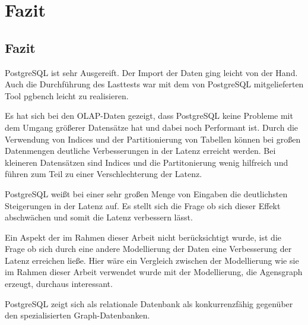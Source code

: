 \chapter{Fazit}
\section{Fazit}

PostgreSQL ist sehr Ausgereift. Der Import der Daten ging leicht von der Hand. Auch die Durchführung des Lasttests war mit dem von PostgreSQL mitgelieferten Tool pgbench leicht zu realisieren.

Es hat sich bei den OLAP-Daten gezeigt, dass PostgreSQL keine Probleme mit dem Umgang größerer Datensätze hat und dabei noch Performant ist. Durch die Verwendung von Indices und der Partitionierung von Tabellen können bei großen Datenmengen deutliche Verbesserungen in der Latenz erreicht werden. Bei kleineren Datensätzen sind Indices und die Partitonierung wenig hilfreich und führen zum Teil zu einer Verschlechterung der Latenz.

PostgreSQL weißt bei einer sehr großen Menge von Eingaben die deutlichsten Steigerungen in der Latenz auf. Es stellt sich die Frage ob sich dieser Effekt abschwächen und somit die Latenz verbessern lässt.

Ein Aspekt der im Rahmen dieser Arbeit nicht berücksichtigt wurde, ist die Frage ob sich durch eine andere Modellierung der Daten eine Verbesserung der Latenz erreichen ließe. Hier wäre ein Vergleich zwischen der Modellierung wie sie im Rahmen dieser Arbeit verwendet wurde mit der Modellierung, die Agensgraph erzeugt, durchaus interessant. 

PostgreSQL zeigt sich als relationale Datenbank als konkurrenzfähig gegenüber den spezialisierten Graph-Datenbanken.